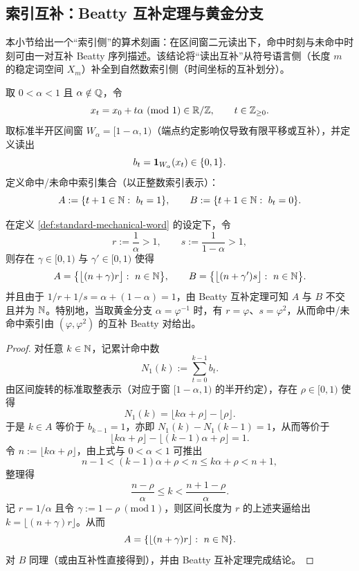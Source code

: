 \subsection{索引互补：Beatty 互补定理与黄金分支}\label{subsec:beatty-complement}本小节给出一个“索引侧”的算术刻画：在区间窗二元读出下，命中时刻与未命中时刻可由一对互补 Beatty 序列描述。该结论将“读出互补”从符号语言侧（长度 $m$ 的稳定词空间 $X_m$）补全到自然数索引侧（时间坐标的互补划分）。\begin{definition}[标准机械词与命中时刻集合]\label{def:standard-mechanical-word}
取 $0<\alpha<1$ 且 $\alpha\notin\mathbb{Q}$，令
\[
x_t=x_0+t\alpha\ (\mathrm{mod}\ 1)\in\RR/\ZZ,\qquad t\in\ZZ_{\ge 0}.
\]
取标准半开区间窗 $W_\alpha=[1-\alpha,1)$（端点约定影响仅导致有限平移或互补），并定义读出
\[
b_t=\mathbf{1}_{W_\alpha}(x_t)\in\{0,1\}.
\]
定义命中/未命中索引集合（以正整数索引表示）：
\[
A:=\{t+1\in\NN:\ b_t=1\},\qquad B:=\{t+1\in\NN:\ b_t=0\}.
\]
\end{definition}\begin{proposition}\label{prop:beatty-complement-indices}
在定义 \ref{def:standard-mechanical-word} 的设定下，令
\[
r:=\frac{1}{\alpha}>1,\qquad s:=\frac{1}{1-\alpha}>1,
\]
则存在 $\gamma\in[0,1)$ 与 $\gamma'\in[0,1)$ 使得
\[
A=\big\{\big\lfloor (n+\gamma)r\big\rfloor:\ n\in\mathbb{N}\big\},\qquad
B=\big\{\big\lfloor (n+\gamma')s\big\rfloor:\ n\in\mathbb{N}\big\}.
\]
并且由于 $1/r+1/s=\alpha+(1-\alpha)=1$，由 Beatty 互补定理可知 $A$ 与 $B$ 不交且并为 $\mathbb{N}$。特别地，当取黄金分支 $\alpha=\varphi^{-1}$ 时，有 $r=\varphi$、$s=\varphi^{2}$，从而命中/未命中索引由 $(\varphi,\varphi^2)$ 的互补 Beatty 对给出。\cite{Beatty1926}
\end{proposition}\begin{proof}
对任意 $k\in\mathbb{N}$，记累计命中数
\[
N_1(k):=\sum_{t=0}^{k-1} b_t.
\]
由区间旋转的标准取整表示（对应于窗 $[1-\alpha,1)$ 的半开约定），存在 $\rho\in[0,1)$ 使得
\[
N_1(k)=\big\lfloor k\alpha+\rho\big\rfloor-\big\lfloor\rho\big\rfloor.
\]
于是 $k\in A$ 等价于 $b_{k-1}=1$，亦即 $N_1(k)-N_1(k-1)=1$，从而等价于
\[
\big\lfloor k\alpha+\rho\big\rfloor-\big\lfloor (k-1)\alpha+\rho\big\rfloor=1.
\]
令 $n:=\lfloor k\alpha+\rho\rfloor$，由上式与 $0<\alpha<1$ 可推出
\[
n-1< (k-1)\alpha+\rho < n \le k\alpha+\rho < n+1,
\]
整理得
\[
\frac{n-\rho}{\alpha}\le k < \frac{n+1-\rho}{\alpha}.
\]
记 $r=1/\alpha$ 且令 $\gamma:=1-\rho\ (\mathrm{mod}\ 1)$，则区间长度为 $r$ 的上述夹逼给出 $k=\lfloor (n+\gamma)r\rfloor$。从而
\[
A=\{\lfloor (n+\gamma)r\rfloor:\ n\in\NN\}.
\]
对 $B$ 同理（或由互补性直接得到），并由 Beatty 互补定理完成结论。
\end{proof}